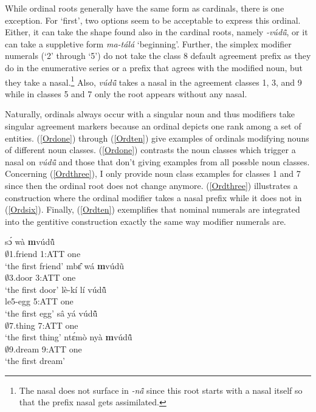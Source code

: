 While ordinal roots generally have the same form as cardinals, there is one exception. For `first', two options seem to be acceptable to express this ordinal. Either, it can take the shape found also in the cardinal roots, namely {\itshape -vúdû̃}, or it can take a suppletive form {\itshape ma-tálá} `beginning'. Further, the simplex modifier numerals (`2' through `5') do not take the class 8 default agreement prefix as they do in the enumerative series or a prefix that agrees with the modified noun, but they take a nasal.\footnote{The nasal does not surface in {\itshape -nã̂} since this root starts with a nasal itself so that the prefix nasal gets assimilated.} Also, {\itshape vúdũ̂} takes a nasal in the agreement classes 1, 3, and 9 while in classes 5 and 7 only the root appears without any nasal.

Naturally, ordinals always occur with a singular noun and thus modifiers take singular agreement markers because an ordinal depicts one rank among a set of entities. (\ref{Ordone}) through (\ref{Ordten}) give examples of ordinals modifying nouns of different noun classes. (\ref{Ordone}) contrasts the noun classes which trigger a nasal on {\itshape vúdũ̂} and those that don't giving examples from all possble noun classes. Concerning (\ref{Ordthree}), I only provide noun class examples for classes 1 and 7 since then the ordinal root does not change anymore. (\ref{Ordthree}) illustrates a construction where the ordinal modifier takes a nasal prefix while it does not in (\ref{Ordsix}). Finally, (\ref{Ordten}) exemplifies that nominal numerals are integrated into the gentitive construction exactly the same way modifier numerals are.

\begin{exe}
\ex\label{Ordone}
\begin{xlist}
\ex \label{Ordone1}
  \gll   sɔ́ wà {\bfseries m}vúdũ̂\\
                $\emptyset$1.friend 1:ATT one \\
    \trans `the first friend'
\ex\label{Ordone2}
 \gll  mbɛ̂ wá {\bfseries m}vúdũ \\
         $\emptyset$3.door 3:ATT one \\
    \trans `the first door'
\ex\label{Ordone3}
 \gll  lè-kí lí vúdũ̂ \\
               le5-egg 5:ATT one \\
    \trans `the first egg'
\ex\label{Ordone4}
 \gll  sâ yá vúdũ̂ \\
              $\emptyset$7.thing 7:ATT one \\
    \trans `the first thing'
\ex\label{Ordone5}
 \gll ntɛ́mò nyà {\bfseries m}vúdũ̂ \\
              $\emptyset$9.dream 9:ATT one \\
    \trans `the first dream'
\end {xlist}
\end {exe}

